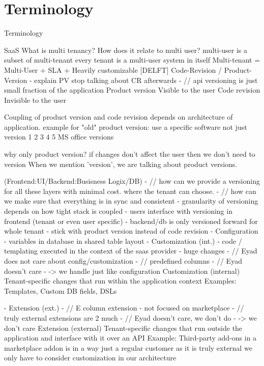 \section{Terminology}
\label{sec:terminology}

Terminology

SaaS
What is multi tenancy? How does it relate to multi user?
  multi-user is a subset of multi-tenant
  every tenant is a multi-user system in itself
  Multi-tenant =  Multi-User + SLA + Heavily customizable [DELFT]
Code-Revision / Product-Version
  - explain PV stop talking about CR afterwards
  - // api versioning is just small fraction of the application
  Product version Visible to the user
  Code revision   Invisible to the user

  Coupling of product version and code revision depends on architecture of application.
  example for "old" product version: use a specific software not just version 1 2 3 4 5
  MS office versions

  why only product version?
  if changes don't affect the user then we don't need to version
  When we mention 'version', we are talking about product versions.


(Frontend:UI/Backend:Busisness Logix/DB)
  - // how can we provide a versioning for all these layers with minimal cost. where the tenant can choose.
  - // how can we make sure that everything is in sync and consistent
  - granularity of versioning depends on how tight stack is coupled
  - users interface with versioning in frontend (tenant or even user specific)
  - backend/db is only versioned forward for whole tenant
  - stick with product version instead of code revision
- Configuration
  - variables in database in shared table layout
- Customization (int.)
  - code / templating executed in the context of the saas provider
  - huge changes
  - // Eyad does not care about config/customization
  - // predefined columns
  - // Eyad doesn't care
  - -> we handle just like configuration
  Customization (internal)
  Tenant-specific changes that run within the application context
  Examples:
  Templates, Custom DB fields, DSLs

- Extension (ext.)
  - // E column extension
  - not focused on marketplace
  - // truly external extensions are 2 much
  - // Eyad doesn't care, we don't do
  - -> we don't care
  Extension (external)
  Tenant-specific changes that run outside the application and interface with it over an API
  Example:
  Third-party add-ons in a marketplace
  addon is in a way just a regular customer as it is truly external
  we only have to consider customization in our architecture



